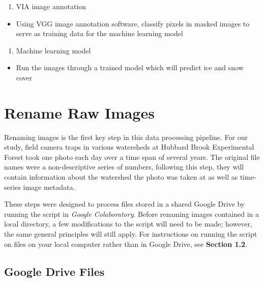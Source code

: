 \documentclass[
]{article}
\providecommand{\tightlist}{%
  \setlength{\itemsep}{0pt}\setlength{\parskip}{0pt}}
\begin{document}
\begin{enumerate}
\def\labelenumi{\arabic{enumi}.}
\setcounter{enumi}{2}
\tightlist
\item
  VIA image annotation
\end{enumerate}

\begin{itemize}
\tightlist
\item
  Using VGG image annotation software, classify pixels in masked images to serve as
  training data for the machine learning model
\end{itemize}

\begin{enumerate}
\def\labelenumi{\arabic{enumi}.}
\setcounter{enumi}{3}
\tightlist
\item
  Machine learning model
\end{enumerate}

\begin{itemize}
\tightlist
\item
  Run the images through a trained model which will predict ice and snow cover
\end{itemize}

\hypertarget{rename-raw-images}{%
\section{Rename Raw Images}\label{rename-raw-images}}

Renaming images is the first key step in this data processing pipeline. For our study, field camera traps in various watersheds at Hubbard Brook Experimental Forest took one photo each day over a time span of several years. The original file names were a non-descriptive series of numbers, following this step, they will contain information about the watershed the photo was taken at as well as time-series image metadata.

These steps were designed to process files stored in a shared Google Drive by
running the script in \emph{Google Colaboratory}. Before renaming images contained in a local directory, a few modifications to the script will need to be made; however, the same general principles will still apply. For instructions on running the script on files on your local computer rather than in Google Drive, see \textbf{Section 1.2}.

\hypertarget{google-drive-files}{%
\subsection{Google Drive Files}\label{google-drive-files}}
\end{document}
